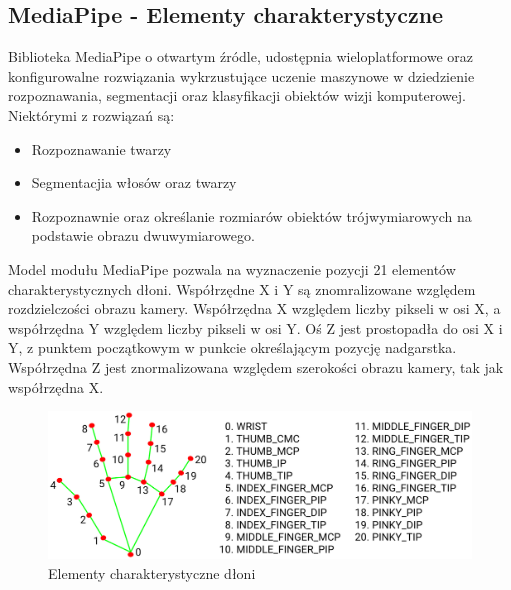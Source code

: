     
    
    \subsection{MediaPipe - Elementy charakterystyczne}
    
    \quad Biblioteka MediaPipe o otwartym źródle, udostępnia wieloplatformowe oraz konfigurowalne rozwiązania wykrzustujące uczenie maszynowe w dziedzienie rozpoznawania, segmentacji oraz klasyfikacji obiektów wizji komputerowej. Niektórymi z rozwiązań są:
    
    \begin{itemize}
        \item Rozpoznawanie twarzy
        \item Segmentacjia włosów oraz twarzy
        \item Rozpoznawnie oraz określanie rozmiarów obiektów trójwymiarowych 
              na podstawie obrazu dwuwymiarowego. 
    \end{itemize}
    
    \quad Model modułu MediaPipe pozwala na wyznaczenie pozycji 21 elementów charakterystycznych dłoni. Współrzędne X i Y są znomralizowane względem rozdzielczości obrazu kamery. Współrzędna X względem liczby pikseli w osi X, a współrzędna Y względem liczby pikseli w osi Y. Oś Z jest prostopadła do osi X i Y, z punktem początkowym w punkcie określającym pozycję nadgarstka. Współrzędna Z jest znormalizowana względem szerokości obrazu kamery, tak jak współrzędna X. 
    
    \begin{figure}[H]
    \begin{center}
        \includegraphics[width=15cm]{../images/hand_landmarks.png}
        \caption{Elementy charakterystyczne dłoni}
    \end{center}
    \end{figure}
    
